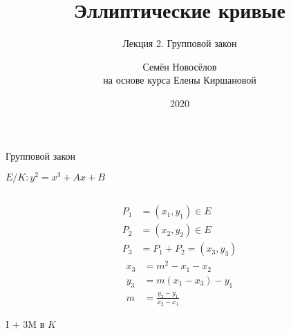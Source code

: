 \documentclass{beamer}
\title{Эллиптические кривые}
\subtitle{Лекция 2. Групповой закон}
\author{Семён Новосёлов\\
\footnotesize{на основе курса Елены Киршановой}}
\institute{БФУ им. И. Канта}
\date{2020}
\begin{document}
\frame{\titlepage}

\begin{frame}{Групповой закон}%
    \begin{center}
        $E/K: y^2 = x^3 + Ax + B$
    \end{center}
    \begin{columns}
        \begin{column}{0.5\textwidth}
            \begin{equation*}
                \begin{split}
                P_1 &= (x_1, y_1) \in E \\
                P_2 &= (x_2, y_2) \in E \\
                P_3 &= P_1 + P_2 = \left(x_3, y_3\right)
                \end{split}
            \end{equation*}
                \begin{equation*}
                    \begin{split}
                        x_3 &= m^2 - x_1 - x_2 \\
                        y_3 &= m\left( x_1 - x_3 \right) - y_1 \\
                        m &= \frac{y_2 - y_1}{x_2 - x_1}
                    \end{split}
                \end{equation*}
            \begin{center}
                \begin{tcolorbox}[enhanced,hbox,colback=box-blue-color!15,colframe=box-blue-color,title=Сложность,center title]
                    \begin{varwidth}{\textwidth}
                        \begin{center}
                            I + $3$M в $K$
                        \end{center}
                    \end{varwidth}
                \end{tcolorbox}	
            \end{center}


\end{column}
\end{columns}
\end{frame}
\end{document}

